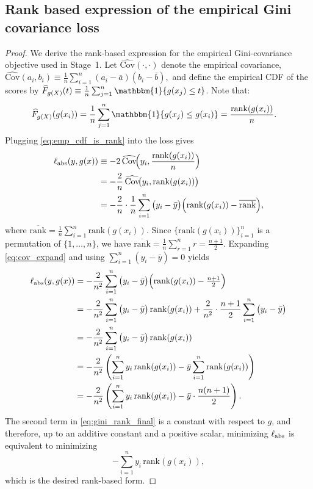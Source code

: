 \documentclass[11pt]{article}
\theoremstyle{plain}
\theoremstyle{plain}
\theoremstyle{plain}
\theoremstyle{plain}
\theoremstyle{plain}
\theoremstyle{plain}
\theoremstyle{plain}
\begin{document}
\subsection{Rank based expression of the empirical Gini covariance loss} \label{gini_form}

\begin{proof}
We derive the rank-based expression for the empirical Gini-covariance objective used in Stage~1.  
Let $\widehat{\mathrm{Cov}}(\cdot,\cdot)$ denote the empirical covariance, $\widehat{\mathrm{Cov}}(a_i,b_i)\equiv \frac{1}{n}\sum_{i=1}^n (a_i-\bar a)(b_i-\bar b),
$ and define the empirical CDF of the scores by $\widehat F_{g(X)}(t)\equiv \frac{1}{n}\sum_{j=1}^n \mathbbm{1}\{g(x_j)\le t\}$. Note that: 
\begin{align}
\widehat F_{g(X)}(g(x_i))
&= \frac{1}{n}\sum_{j=1}^n \mathbbm{1}\{g(x_j)\le g(x_i)\}
 = \frac{\mathrm{rank}(g(x_i))}{n}.
\label{eq:emp_cdf_is_rank}
\end{align}
Plugging \eqref{eq:emp_cdf_is_rank} into the loss gives
\begin{align}
\ell_{\textup{abs}}(y,g(x))
&\equiv -2\,\widehat{\mathrm{Cov}}\!\Big(y_i,\frac{\mathrm{rank}(g(x_i))}{n}\Big) \notag\\
&= -\frac{2}{n}\,\widehat{\mathrm{Cov}}\!\big(y_i,\mathrm{rank}(g(x_i))\big) \notag\\
&= -\frac{2}{n}\cdot \frac{1}{n}\sum_{i=1}^n \big(y_i-\bar y\big)\Big(\mathrm{rank}(g(x_i))-\overline{\mathrm{rank}}\Big),
\label{eq:cov_expand}
\end{align}
where $\overline{\mathrm{rank}}=\frac{1}{n}\sum_{i=1}^n \mathrm{rank}(g(x_i))$.
Since $\{\mathrm{rank}(g(x_i))\}_{i=1}^n$ is a permutation of $\{1,\dots,n\}$, we have $\overline{\mathrm{rank}}=\frac{1}{n}\sum_{r=1}^n r = \frac{n+1}{2}.
$
Expanding \eqref{eq:cov_expand} and using $\sum_{i=1}^n (y_i-\bar y)=0$ yields
\begin{align}
\ell_{\textup{abs}}(y,g(x))
&= -\frac{2}{n^2}\sum_{i=1}^n \big(y_i-\bar y\big)\Big(\mathrm{rank}(g(x_i))-\tfrac{n+1}{2}\Big) \notag\\
&= -\frac{2}{n^2}\sum_{i=1}^n \big(y_i-\bar y\big)\,\mathrm{rank}(g(x_i)) 
    + \frac{2}{n^2}\cdot \frac{n+1}{2}\sum_{i=1}^n \big(y_i-\bar y\big) \notag\\
&= -\frac{2}{n^2}\sum_{i=1}^n \big(y_i-\bar y\big)\,\mathrm{rank}(g(x_i)) \notag\\
&= -\frac{2}{n^2}\left(\sum_{i=1}^n y_i\,\mathrm{rank}(g(x_i))
      -\bar y\sum_{i=1}^n \mathrm{rank}(g(x_i))\right) \notag\\
&= -\frac{2}{n^2}\left(\sum_{i=1}^n y_i\,\mathrm{rank}(g(x_i))
      -\bar y\cdot \frac{n(n+1)}{2}\right).
\label{eq:gini_rank_final}
\end{align}
The second term in \eqref{eq:gini_rank_final} is a constant with respect to $g$, and therefore, up to an additive constant and a positive scalar, minimizing $\ell_{\textup{abs}}$ is equivalent to minimizing
\[
-\sum_{i=1}^n y_i\,\mathrm{rank}(g(x_i)),
\]
which is the desired rank-based form.
\end{proof}
\end{document}
